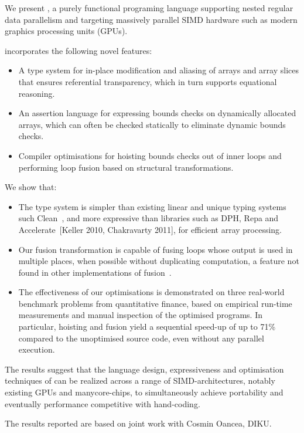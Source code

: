 We present \LO{}, a purely functional programing language supporting nested
regular data parallelism and targeting massively parallel SIMD hardware
such as modern graphics processing units (GPUs).

\LO{} incorporates the following novel features:

\begin{itemize}
\item A type system for in-place modification and aliasing of arrays
  and array slices that ensures referential transparency, which in
  turn supports equational reasoning.

\item An assertion language for expressing bounds checks on
  dynamically allocated arrays, which can often be checked statically
  to eliminate dynamic bounds checks.

\item Compiler optimisations for hoisting bounds checks out of inner
  loops and performing loop fusion based on structural
  transformations.
\end{itemize}

We show that:

\begin{itemize}
\item The type system is simpler than existing linear and unique
  typing systems such Clean~\cite{barendsen1996uniqueness}, and more
  expressive than libraries such as DPH, Repa and
  Accelerate~\cite{Chak06DPH,keller2010regular,ArrayAccelerate}[Keller
  2010, Chakravarty 2011], for efficient array processing.

\item Our fusion transformation is capable of fusing loops whose
  output is used in multiple places, when possible without duplicating
  computation, a feature not found in other implementations of
  fusion~\cite{jones2001playing}.

\item The effectiveness of our optimisations is demonstrated on three
  real-world benchmark problems from quantitative finance, based on
  empirical run-time measurements and manual inspection of the
  optimised programs.  In particular, hoisting and fusion yield a
  sequential speed-up of up to 71\% compared to the unoptimised source
  code, even without any parallel execution.
\end{itemize}

The results suggest that the language design, expressiveness and
optimisation techniques of \LO{} can be realized across a range of
SIMD-architectures, notably existing GPUs and manycore-chips, to
simultaneously achieve portability and eventually performance
competitive with hand-coding.

The results reported are based on joint work with Cosmin Oancea, DIKU.


